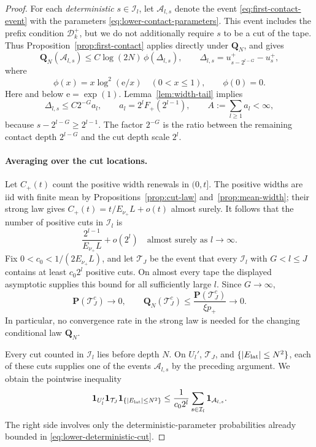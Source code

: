 \begin{proof}
For each \emph{deterministic} $s\in\mathcal I_l$, let $\mathcal A_{l,s}$ denote
the event \eqref{eq:first-contact-event} with the parameters
\eqref{eq:lower-contact-parameters}.  This event includes the prefix condition
$\mathcal D_k^+$, but we do not additionally require $s$ to be a cut of the
tape.  Thus Proposition~\ref{prop:first-contact} applies directly under
$\mathbf Q_N$, and gives
\begin{equation}\label{eq:lower-deterministic-cut}
 \mathbf Q_N(\mathcal A_{l,s})
 \le C\log(2N)\,\phi(\Delta_{l,s}),\qquad
 \Delta_{l,s}=u^+_{s-2^{l-G}}-u_s^+,
\end{equation}
where
\[
 \phi(x)=x\log^2(\mathrm e/x)\quad(0<x\le1),\qquad \phi(0)=0.
\]
Here and below $\mathrm e=\exp(1)$.  Lemma~\ref{lem:width-tail} implies
\begin{equation}\label{eq:lower-delta-tail}
 \Delta_{l,s}\le C2^{-G}a_l,\qquad
 a_l=2^l F_+(2^{l-1}),\qquad
 A:=\sum_{l\ge1}a_l<\infty,
\end{equation}
because $s-2^{l-G}\ge2^{l-1}$.
The factor $2^{-G}$ is the ratio between the remaining contact depth
$2^{l-G}$ and the cut depth scale $2^l$.

\paragraph{Averaging over the cut locations.}
Let $C_+(t)$ count the positive width renewals in $(0,t]$.  The positive widths
are iid with finite mean by Propositions~\ref{prop:cut-law}
and~\ref{prop:mean-width}; their strong law gives
$C_+(t)=t/E_{\nu_+}L+o(t)$ almost surely.  It follows that the number of positive
cuts in $\mathcal I_l$ is
\[
 \frac{2^{l-1}}{E_{\nu_+}L}+o(2^l)
 \quad\text{almost surely as }l\longrightarrow\infty.
\]
Fix $0<c_0<1/(2E_{\nu_+}L)$, and let $\mathcal T_J$ be the event that every
$\mathcal I_l$ with $G<l\le J$ contains at least $c_0 2^l$ positive cuts.  On
almost every tape the displayed asymptotic supplies this bound for all
sufficiently large $l$.  Since $G\to\infty$,
\[
 \mathbf P(\mathcal T_J^c)\longrightarrow0,
 \qquad
 \mathbf Q_N(\mathcal T_J^c)
 \le\frac{\mathbf P(\mathcal T_J^c)}{\xi p_+}\longrightarrow0.
\]
In particular, no convergence rate in the strong law is needed for the
changing conditional law $\mathbf Q_N$.

Every cut counted in $\mathcal I_l$ lies before depth $N$.  On $U_l'$,
$\mathcal T_J$, and $\{\lvert E_{\rm lat}\rvert\le N^2\}$, each of these cuts supplies
one of the events $\mathcal A_{l,s}$ by the preceding argument.  We obtain the
pointwise inequality
\begin{equation}\label{eq:cut-averaging}
 \mathbf 1_{U_l'}\mathbf 1_{\mathcal T_J}\mathbf 1_{\{\lvert E_{\rm lat}\rvert\le N^2\}}
 \le\frac{1}{c_0 2^l}\sum_{s\in\mathcal I_l}\mathbf 1_{\mathcal A_{l,s}}.
\end{equation}
The right side involves only the deterministic-parameter probabilities already
bounded in \eqref{eq:lower-deterministic-cut}.


\end{proof}
